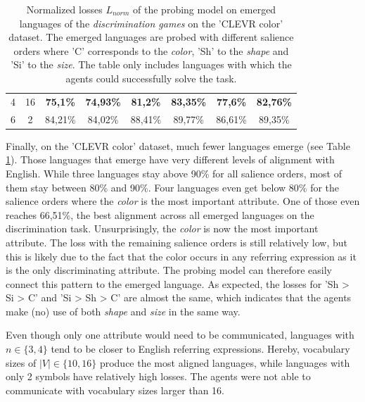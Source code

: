 \begin{table}[ht]
\begin{tabular}{cc|c|c|c|c|c|c}
        {4} & {16}  & \textbf{75,1\%}          & \textbf{74,93\%}         & \textbf{81,2\%}          & \textbf{83,35\%}         & \textbf{77,6\%}          & \textbf{82,76\%}         \\
        {6} & {2}   & {84,21\%}                & {84,02\%}                & {88,41\%}                & {89,77\%}                & {86,61\%}                & {89,35\%}                \\
        \bottomrule
    \end{tabular}
    \caption{Normalized losses $L_{norm}$ of the probing model on emerged languages of the \emph{discrimination games} on the 'CLEVR color' dataset. The emerged languages are probed with different salience orders where 'C' corresponds to the \emph{color}, 'Sh' to the \emph{shape} and 'Si' to the \emph{size}. The table only includes languages with which the agents could successfully solve the task.}
    \label{tab:probing:discriminator:colour}
\end{table}

Finally, on the 'CLEVR color' dataset, much fewer languages emerge (see Table \ref{tab:probing:discriminator:colour}).
Those languages that emerge have very different levels of alignment with English.
While three languages stay above 90\% for all salience orders, most of them stay between 80\% and 90\%.
Four languages even get below 80\% for the salience orders where the \emph{color} is the most important attribute.
One of those even reaches 66,51\%, the best alignment across all emerged languages on the discrimination task.
Unsurprisingly, the \emph{color} is now the most important attribute.
The loss with the remaining salience orders is still relatively low, but this is likely due to the fact that the color occurs in any referring expression as it is the only discriminating attribute.
The probing model can therefore easily connect this pattern to the emerged language.
As expected, the losses for 'Sh > Si > C' and 'Si > Sh > C' are almost the same, which indicates that the agents make (no) use of both \emph{shape} and \emph{size} in the same way.

Even though only one attribute would need to be communicated, languages with $n \in \{3,4\}$ tend to be closer to English referring expressions.
Hereby, vocabulary sizes of $|V| \in \{10,16\}$ produce the most aligned languages, while languages with only 2 symbols have relatively high losses.
The agents were not able to communicate with vocabulary sizes larger than 16.